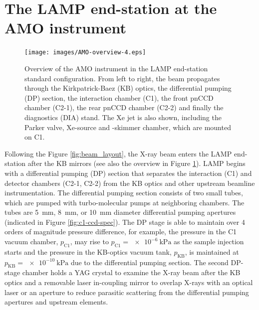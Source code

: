 \section{The LAMP end-station at the AMO instrument}\label{sec:LAMP-endstation}
\begin{figure}
	\centering
		\texttt{[image: images/AMO-overview-4.eps]}
	\caption[Overview of the AMO instrument in the LAMP end-station configuration.]{Overview of the AMO instrument in the LAMP end-station standard configuration. From left to right, the beam propagates through the Kirkpatrick-Baez (KB) optics, the differential pumping (DP) section, the interaction chamber (C1), the front pnCCD chamber (C2-1), the rear pnCCD chamber (C2-2) and finally the diagnostics (DIA) stand. The Xe jet is also shown, including the Parker valve, Xe-source and -skimmer chamber, which are mounted on C1.
}
	\label{fig:LAMP-overview}
\end{figure}
Following the Figure \ref{fig:beam_layout}, the X-ray beam enters the LAMP end-station after the KB mirrors (see also the overview in Figure \ref{fig:LAMP-overview}). LAMP begins with a differential pumping (DP) section that separates the interaction (C1) and detector chambers (C2-1, C2-2) from the KB optics and other upstream beamline instrumentation. The differential pumping section consists of two small tubes, which are pumped with turbo-molecular pumps at neighboring chambers. The tubes are \SI{5}{\milli\meter}, \SI{8}{\milli\meter}, or \SI{10}{\milli\meter} diameter differential pumping apertures (indicated in Figure \ref{fig:c1-ccd-spec}). The DP stage is able to maintain over 4 orders of magnitude pressure difference, for example, the pressure in the C1 vacuum chamber, $p_{\text{C1}}$, may rise to $p_{\text{C1}}=\SI{e-6}{\kilo\pascal}$ as the sample injection starts and the pressure in the KB-optics vacuum tank, $p_{\text{KB}}$, is maintained at $p_{\text{KB}}=\SI{e-10}{\kilo\pascal}$ due to the differential pumping section. The second DP-stage chamber holds a YAG crystal to examine the X-ray beam after the KB optics and a removable laser in-coupling mirror to overlap X-rays with an optical laser or an aperture to reduce parasitic scattering from the differential pumping apertures and upstream elements.\\[1\baselineskip]
